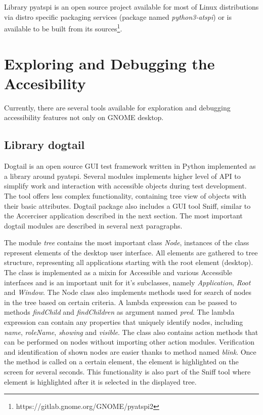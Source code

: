 Library pyatspi is an open source project available for most of Linux distributions via distro specific packaging services (package named \textit{python3-atspi}) or is available to be built from its sources\footnote{https://gitlab.gnome.org/GNOME/pyatspi2}.

\section{Exploring and Debugging the Accesibility}
Currently, there are several tools available for exploration and debugging accessibility features not only on GNOME desktop. 
\subsection{Library dogtail}
Dogtail is an open source GUI test framework written in Python implemented as a library around pyatspi. Several modules implements higher level of API to simplify work and interaction with accessible objects during test development. The tool offers less complex functionality, containing tree view of objects with their basic attributes\cite{dogtail_doc}. Dogtail package also includes a GUI tool Sniff, similar to the Accerciser application described in the next section. The most important dogtail modules are described in several next paragraphs.

The module \textit{tree} contains the most important class \textit{Node}, instances of the class represent elements of the desktop user interface. All elements are gathered to tree structure, representing all applications starting with the root element (desktop). The class is implemented as a mixin for Accessible and various Accessible interfaces and is an important unit for it's subclasses, namely \textit{Application}, \textit{Root} and \textit{Window}. The Node class also implements methods used for search of nodes in the tree based on certain criteria. A lambda expression can be passed to methods \textit{findChild} and \textit{findChildren} as argument named \textit{pred}. The lambda expression can contain any properties that uniquely identify nodes, including \textit{name}, \textit{roleName},  \textit{showing} and \textit{visible}. The class also contains action methods that can be performed on nodes without importing other action modules. Verification and identification of shown nodes are easier thanks to method named \textit{blink}. Once the method is called on a certain element, the element is highlighted on the screen for several seconds. This functionality is also part of the Sniff tool where element is highlighted after it is selected in the displayed tree.

